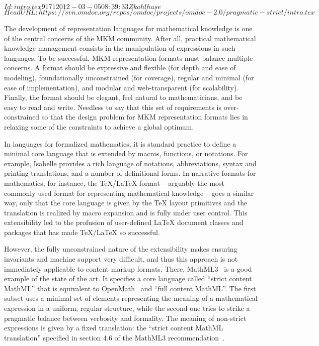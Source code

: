 \svnInfo $Id: intro.tex 9171 2012-03-05 08:39:33Z kohlhase $
\svnKeyword $HeadURL: https://svn.omdoc.org/repos/omdoc/projects/omdoc-2.0/pragmatic-strict/intro.tex $

The development of representation languages for mathematical knowledge is one of the
central concerns of the MKM community. After all, practical mathematical knowledge
management consists in the manipulation of expressions in such languages. To be
successful, MKM representation formats must balance multiple concerns. A format should be
expressive and flexible (for depth and ease of modeling), foundationally unconstrained
(for coverage), regular and minimal (for ease of implementation), and modular and
web-transparent (for scalability). Finally, the format should be elegant, feel natural to
mathematicians, and be easy to read and write. Needless to say that this set of
requirements is over-constrained so that the design problem for MKM representation formats
lies in relaxing some of the constraints to achieve a global optimum.

In languages for formalized mathematics, it is standard practice to define a minimal
core language that is extended by macros, functions, or notations.
For example, Isabelle \cite{isabelle} provides a rich language of notations, abbreviations, syntax and printing translations, and a number of definitional forms.
In narrative formats for mathematics, for
instance, the {\TeX/\LaTeX} format -- arguably the most commonly used format for
representing mathematical knowledge -- goes a similar way, only that the core language is
given by the {\TeX} layout primitives and the translation is realized by macro expansion
and is fully under user control. This extensibility led to the profusion of
user-defined {\LaTeX} document classes and packages that has made {\TeX/\LaTeX} so
successful.

However, the fully unconstrained nature of the extensibility makes ensuring invariants and
machine support very difficult, and thus this approach is not immediately applicable to
content markup formats. There, MathML3~\cite{CarlisleEd:MathML3:base} is a good example of
the state of the art. It specifies a core language called ``strict content MathML'' that
is equivalent to OpenMath~\cite{BusCapCar:2oms04} and ``full content MathML''. The first
subset uses a minimal set of elements representing the meaning of a mathematical
expression in a uniform, regular structure, while the second one tries to strike a
pragmatic balance between verbosity and formality. The meaning of non-strict expressions
is given by a fixed translation: the ``strict content MathML translation'' specified in
section 4.6 of the MathML3 recommendation~\cite{CarlisleEd:MathML3:base}.

